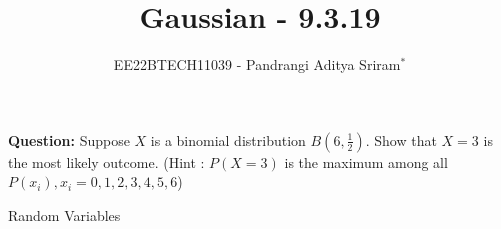 \documentclass[journal,12pt,twocolumn]{IEEEtran}
\theoremstyle{remark}
\begin{document}

\vspace{3cm}

\title{Gaussian - 9.3.19}
\author{EE22BTECH11039 - Pandrangi Aditya Sriram$^{*}$%
}
\maketitle
\newpage
\bigskip

\renewcommand{\thefigure}{\theenumi}
\renewcommand{\thetable}{\theenumi}


\vspace{3cm}
\textbf{Question:} Suppose $X$ is a binomial distribution $B\left(6,\frac{1}{2}\right)$. Show that $X=3$ is the most likely outcome.
(Hint : $P(X=3)$ is the maximum among all $P(x_i),x_i=0,1,2,3,4,5,6$)\\
\solution
\fi
\begin{table}[h]
    
    \label{tab:9.3.19_table}
    \caption{Random Variables}
\end{table}
\end{document}
